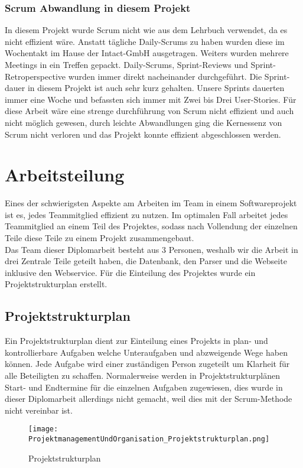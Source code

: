 \subsubsection{Scrum Abwandlung in diesem Projekt}
\label{sec:ScrumAbwandlungInDiesemProjekt}
In diesem Projekt wurde Scrum nicht wie aus dem Lehrbuch verwendet, da es nicht effizient wäre. Anstatt tägliche Daily-Scrums zu haben wurden diese im Wochentakt im Hause der Intact-GmbH ausgetragen. Weiters wurden mehrere Meetings in ein Treffen gepackt. Daily-Scrums, Sprint-Reviews und Sprint-Retroperspective wurden immer direkt nacheinander durchgeführt. Die Sprint-dauer in diesem Projekt ist auch sehr kurz gehalten. Unsere Sprints dauerten immer eine Woche und befassten sich immer mit Zwei bis Drei User-Stories. Für diese Arbeit wäre eine strenge durchführung von Scrum nicht effizient und auch nicht möglich gewesen, durch leichte Abwandlungen ging die Kernessenz von Scrum nicht verloren und das Projekt konnte effizient abgeschlossen werden.

\section{Arbeitsteilung}
\label{ref:Arbeitsteilung}
Eines der schwierigsten Aspekte am Arbeiten im Team in einem Softwareprojekt ist es, jedes Teammitglied effizient zu nutzen. Im optimalen Fall arbeitet jedes Teammitglied an einem Teil des Projektes, sodass nach Vollendung der einzelnen Teile diese Teile zu einem Projekt zusammengebaut. \\
Das Team dieser Diplomarbeit besteht aus 3 Personen, weshalb wir die Arbeit in drei Zentrale Teile geteilt haben, die Datenbank, den Parser und die Webseite inklusive den Webservice. Für die Einteilung des Projektes wurde ein Projektstrukturplan erstellt.

\subsection{Projektstrukturplan}
\label{ref:Projektstrukturplan}
Ein Projektstrukturplan dient zur Einteilung eines Projekts in plan- und kontrollierbare Aufgaben welche Unteraufgaben und abzweigende Wege haben können. Jede Aufgabe wird einer zuständigen Person zugeteilt um Klarheit für alle Beteiligten zu schaffen. Normalerweise werden in Projektstrukturplänen Start- und Endtermine für die einzelnen Aufgaben zugewiesen, dies wurde in dieser Diplomarbeit allerdings nicht gemacht, weil dies mit der Scrum-Methode nicht vereinbar ist.
\begin{figure}[H]
	\texttt{[image: ProjektmanagementUndOrganisation\_Projektstrukturplan.png]}
    \caption{Projektstrukturplan}
    \label{fig:projektStrukturplan}
\end{figure}

